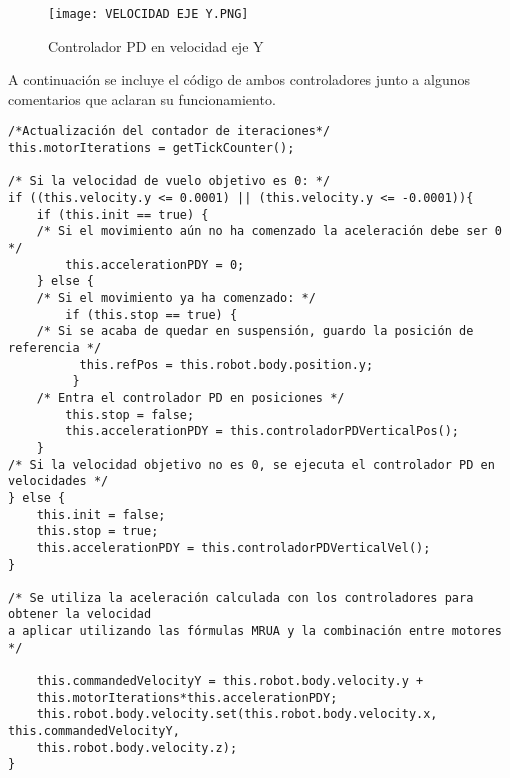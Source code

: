 \begin{figure}[h!]
    \centering
    \texttt{[image: VELOCIDAD EJE Y.PNG]}
    \caption{Controlador PD en velocidad eje Y}
    \label{fig:pd_velY}
\end{figure}

A continuación se incluye el código de ambos controladores junto a algunos comentarios que aclaran su funcionamiento.

\footnotesize {
\begin{verbatim}
/*Actualización del contador de iteraciones*/
this.motorIterations = getTickCounter(); 
           
/* Si la velocidad de vuelo objetivo es 0: */
if ((this.velocity.y <= 0.0001) || (this.velocity.y <= -0.0001)){
    if (this.init == true) {
    /* Si el movimiento aún no ha comenzado la aceleración debe ser 0 */
        this.accelerationPDY = 0;
    } else { 
    /* Si el movimiento ya ha comenzado: */
	    if (this.stop == true) {
	/* Si se acaba de quedar en suspensión, guardo la posición de referencia */
		  this.refPos = this.robot.body.position.y;
		 }
	/* Entra el controlador PD en posiciones */
        this.stop = false;
		this.accelerationPDY = this.controladorPDVerticalPos();
	}
/* Si la velocidad objetivo no es 0, se ejecuta el controlador PD en velocidades */
} else {
    this.init = false;
    this.stop = true;
    this.accelerationPDY = this.controladorPDVerticalVel();
}
            
/* Se utiliza la aceleración calculada con los controladores para obtener la velocidad 
a aplicar utilizando las fórmulas MRUA y la combinación entre motores */
            
    this.commandedVelocityY = this.robot.body.velocity.y + 
    this.motorIterations*this.accelerationPDY;
    this.robot.body.velocity.set(this.robot.body.velocity.x, this.commandedVelocityY,
    this.robot.body.velocity.z); 
}
\end{verbatim}
}

